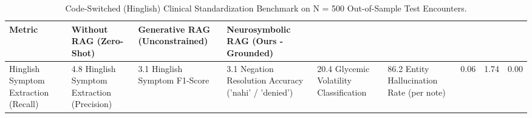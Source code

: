 \begin{table}
\caption{Code-Switched (Hinglish) Clinical Standardization Benchmark on N = 500 Out-of-Sample Test Encounters.}
\label{tab:hinglish_benchmark}
\begin{tabular}{llll}
\toprule
Metric & Without RAG (Zero-Shot) & Generative RAG (Unconstrained) & Neurosymbolic RAG (Ours - Grounded) \\
\midrule
Hinglish Symptom Extraction (Recall) & 4.8%
Hinglish Symptom Extraction (Precision) & 3.1%
Hinglish Symptom F1-Score & 3.1%
Negation Resolution Accuracy ('nahi' / 'denied') & 20.4%
Glycemic Volatility Classification & 86.2%
Entity Hallucination Rate (per note) & 0.06 & 1.74 & 0.00 \\
\bottomrule
\end{tabular}
\end{table}
